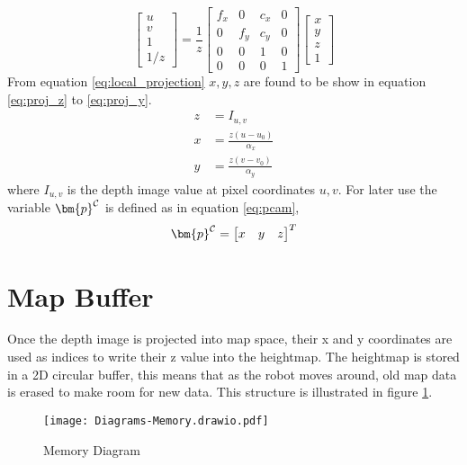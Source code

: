         \begin{equation} \label{eq:local_projection}
            \begin{bmatrix}
                u \\
                v \\
                1 \\
                1/z
            \end{bmatrix}
            = \frac{1}{z}
            \begin{bmatrix}
                f_x & 0 & c_x & 0 \\
                0 & f_y & c_y & 0 \\
                0 & 0 & 1 & 0 \\
                0 & 0 & 0 & 1
            \end{bmatrix}
            \begin{bmatrix}
                x\\
                y\\
                z\\
                1
            \end{bmatrix}
        \end{equation}
        From equation \ref{eq:local_projection} \(x,y,z\) are found to be show in equation \ref{eq:proj_z} to \ref{eq:proj_y}.
        \begin{align}
            z &= I_{u,v} \label{eq:proj_z}\\[0.2cm]
            x &= \frac{z(u - u_0)}{\alpha_x}\label{eq:proj_x} \\
            y &= \frac{z(v - v_0)}{\alpha_y}\label{eq:proj_y}
        \end{align}
        where \(I_{u,v}\) is the depth image value at pixel coordinates \(u,v\). For later use the variable \(\bm{p} \inrefframe{C}\) is defined as in equation \ref{eq:pcam},
        \begin{equation}\label{eq:pcam}
            \bm{p}\inrefframe{C}=
            \begin{bmatrix}
                x &y &z
            \end{bmatrix}^T
        \end{equation}

    \section{Map Buffer}
        Once the depth image is projected into map space, their x and y coordinates are used as indices to write their z value into the heightmap. The heightmap is stored in
        a 2D circular buffer, this means that as the robot moves around, old map data is erased to make room for new data. This structure is illustrated in figure \ref{fig:memory}.
        \begin{figure}[h]
            \centering
            \texttt{[image: Diagrams-Memory.drawio.pdf]}
            \caption{Memory Diagram}
            \label{fig:memory}
        \end{figure}

